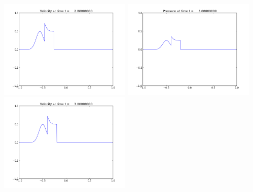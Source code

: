 \documentclass[11pt]{article}
\begin{document}
\includegraphics[width=0.475\textwidth]{frame0024fig2.png}
\vskip 10pt 
\includegraphics[width=0.475\textwidth]{frame0025fig1.png}
\includegraphics[width=0.475\textwidth]{frame0025fig2.png}
\end{document}
